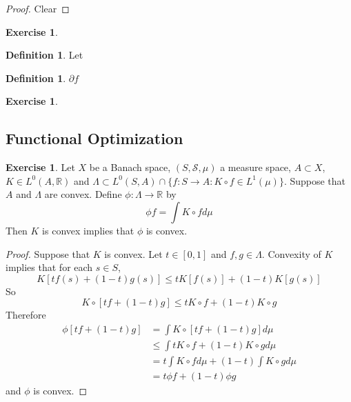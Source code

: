 \documentclass[12pt]{amsart}
\theoremstyle{definition}
\newtheorem{defn}[definition]{Definition}
\newtheorem{ex}[definition]{Exercise}
\newcommand{\Lam}{\Lambda}
\newcommand{\R}{\mathbb{R}}
\newcommand{\MS}{\mathcal{S}}
\newcommand{\ui}{[0,1]}
\begin{document}
	\begin{proof}
	Clear
	\end{proof}
	
	\begin{ex}
	
	\end{ex}
	
	\newpage
	
	
	
	
	
	
	
	
	
	
	\begin{defn}
	Let 
	\end{defn}
	
	\begin{defn}
	$\partial f$
	\end{defn}	
	
	\begin{ex}
	
	\end{ex}
	
	
	\subsection{Functional Optimization}
	\begin{ex}
	Let $X$ be a Banach space, $(S, \MS, \mu)$ a measure space, $A \subset X$, $K \in L^0(A, \R)$ and $\Lam \subset L^0(S, A) \cap \{f:S \rightarrow A:  K \circ f \in L^1(\mu) \}$. Suppose that $A$ and $\Lam$ are convex. Define $\phi: \Lam \rightarrow \R$ by $$\phi f = \int K\circ f d \mu $$
	Then $K$ is convex implies that $\phi$ is convex. 
	\end{ex}	
	
	\begin{proof}
	Suppose that $K$ is convex. Let $t \in \ui$ and $f, g \in \Lam$. Convexity of $K$ implies that for each $s \in S$, $$K[tf(s) + (1-t)g(s)] \leq tK[f(s)] + (1-t)K[g(s)]$$ So $$K \circ [tf +(1-t)g] \leq t K \circ f + (1-t) K \circ g$$
	Therefore 
	\begin{align*}
	\phi[tf + (1-t) g]
	&= \int K \circ [tf +(1-t)g] d \mu \\
	& \leq  \int t K \circ f + (1-t) K \circ g d \mu \\
	&= t \int K \circ f d\mu + (1-t) \int K \circ g d \mu \\
	&= t \phi f + (1-t) \phi g
	\end{align*}
	and $\phi$ is convex.
	\end{proof}
	
\end{document}
